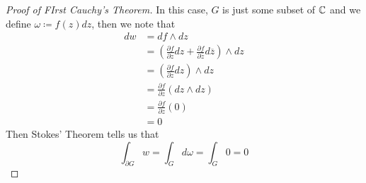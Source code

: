 \begin{proof}[Proof of FIrst Cauchy's Theorem]
In this case, $G$ is just some subset of $\mathbb{C}$ and we define $\omega \coloneqq f(z) dz$, then we note that
\begin{align*}
    dw &= df \wedge dz\\
    &= (\frac{\partial f}{\partial z} dz + \frac{\partial f}{\partial \overline{z}} d\overline{z}) \wedge dz\\
    &= (\frac{\partial f}{\partial z} dz) \wedge dz \tag*{Cauchy-Riemann Equation}\\
    &= \frac{\partial f}{\partial z} (dz \wedge dz)\\
    &= \frac{\partial f}{\partial z} (0)\\
    &= 0
\end{align*}
Then Stokes' Theorem tells us that
\[\int_{\partial G} w = \int_G d \omega = \int_G 0 = 0\]
\end{proof}